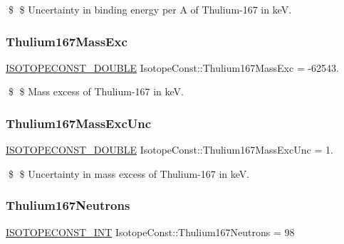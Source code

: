 \$ \$ Uncertainty in binding energy per A of Thulium-\/167 in keV. \mbox{\label{group___isotope_const-_thulium-_tm167_ga604a479fbdc4ef2f1f2e73c6ef5f087d}} 
\subsubsection{\texorpdfstring{Thulium167\+Mass\+Exc}{Thulium167MassExc}}
{\footnotesize\ttfamily \mbox{\hyperlink{group___isotope_const-_macros_ga8f45a7272ce02c0b4c65c44636ed719a}{I\+S\+O\+T\+O\+P\+E\+C\+O\+N\+S\+T\+\_\+\+D\+O\+U\+B\+LE}} Isotope\+Const\+::\+Thulium167\+Mass\+Exc = -\/62543.}

\$ \$ Mass excess of Thulium-\/167 in keV. \mbox{\label{group___isotope_const-_thulium-_tm167_gada64dc2288cc6d2768db92ef115c292b}} 
\subsubsection{\texorpdfstring{Thulium167\+Mass\+Exc\+Unc}{Thulium167MassExcUnc}}
{\footnotesize\ttfamily \mbox{\hyperlink{group___isotope_const-_macros_ga8f45a7272ce02c0b4c65c44636ed719a}{I\+S\+O\+T\+O\+P\+E\+C\+O\+N\+S\+T\+\_\+\+D\+O\+U\+B\+LE}} Isotope\+Const\+::\+Thulium167\+Mass\+Exc\+Unc = 1.}

\$ \$ Uncertainty in mass excess of Thulium-\/167 in keV. \mbox{\label{group___isotope_const-_thulium-_tm167_ga81e1a5795991c0dbad4d01e7f12bee3e}} 
\subsubsection{\texorpdfstring{Thulium167\+Neutrons}{Thulium167Neutrons}}
{\footnotesize\ttfamily \mbox{\hyperlink{group___isotope_const-_macros_ga5f18360b3e99483a35c32d789e62621c}{I\+S\+O\+T\+O\+P\+E\+C\+O\+N\+S\+T\+\_\+\+I\+NT}} Isotope\+Const\+::\+Thulium167\+Neutrons = 98}


